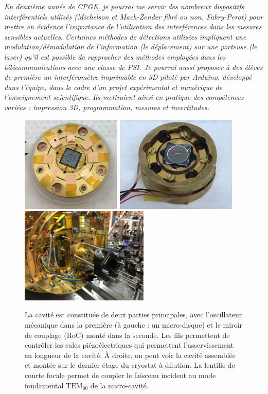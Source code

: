 \documentclass[12pt,a4paper]{article}
\newcommand{\uroc}{\micro RoC}
\begin{document}
\textit{En deuxième année de CPGE, je pourrai me servir des nombreux dispositifs interférentiels utilisés (Michelson et Mach-Zender fibré ou non, Fabry-Perot) pour mettre en évidence l'importance de l'utilisation des interférences dans les mesures sensibles actuelles.
Certaines méthodes de détections utilisées impliquent une modulation/démodulation de l'information (le déplacement) sur une porteuse (le laser) qu'il est possible de rapprocher des méthodes employées dans les télécommunications avec une classe de PSI.
Je pourrai aussi proposer à des élèves de première un interféromètre imprimable en 3D piloté par Arduino, développé dans l'équipe, dans le cadre d'un projet expérimental et numérique de l'enseignement scientifique.
Ils mettraient ainsi en pratique des compétences variées : impression 3D, programmation, mesures et incertitudes.}

\begin{figure}
\center
\includegraphics[height=130pt]{figures/cavity_microwheel.jpg}
\includegraphics[height=130pt]{figures/cavity_uroc.jpg}
\includegraphics[height=130pt]{figures/IMG_1766.JPG}
\caption{La cavité est constituée de deux parties principales, avec l'oscillateur mécanique dans la première (à gauche : un micro-disque) et le miroir de couplage (\uroc) monté dans la seconde.
Les fils permettent de contrôler les cales piézoélectriques qui permettent l'asservissement en longueur de la cavité.
À droite, on peut voir la cavité assemblée et montée sur le dernier étage du cryostat à dilution.
La lentille de courte focale permet de coupler le faisceau incident au mode fondamental $\mathrm{TEM_{00}}$ de la micro-cavité.}
\label{fig:cavity}
\end{figure}
\end{document}
